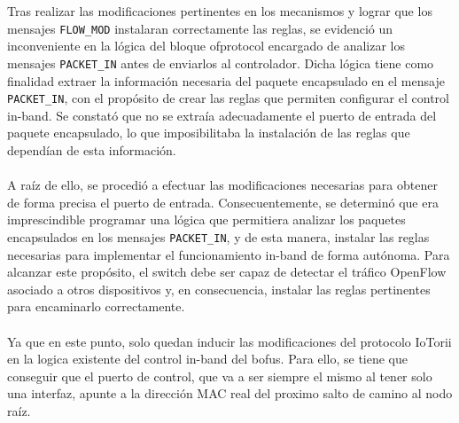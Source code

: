 Tras realizar las modificaciones pertinentes en los mecanismos y lograr que los mensajes \texttt{FLOW\_MOD} instalaran correctamente las reglas, se evidenció un inconveniente en la lógica del bloque ofprotocol encargado de analizar los mensajes \texttt{PACKET\_IN} antes de enviarlos al controlador. Dicha lógica tiene como finalidad extraer la información necesaria del paquete encapsulado en el mensaje \texttt{PACKET\_IN}, con el propósito de crear las reglas que permiten configurar el control in-band. Se constató que no se extraía adecuadamente el puerto de entrada del paquete encapsulado, lo que imposibilitaba la instalación de las reglas que dependían de esta información.\\
\\
A raíz de ello, se procedió a efectuar las modificaciones necesarias para obtener de forma precisa el puerto de entrada. Consecuentemente, se determinó que era imprescindible programar una lógica que permitiera analizar los paquetes encapsulados en los mensajes \texttt{PACKET\_IN}, y de esta manera, instalar las reglas necesarias para implementar el funcionamiento in-band de forma autónoma. Para alcanzar este propósito, el switch debe ser capaz de detectar el tráfico OpenFlow asociado a otros dispositivos y, en consecuencia, instalar las reglas pertinentes para encaminarlo correctamente. \\
\\
Ya que en este punto, solo quedan inducir las modificaciones del protocolo IoTorii en la logica existente del control in-band del \gls{bofus}. Para ello, se tiene que conseguir que el puerto de control, que va a ser siempre el mismo al tener solo una interfaz, apunte a la dirección MAC real del proximo salto de camino al nodo raíz.

\newpage

